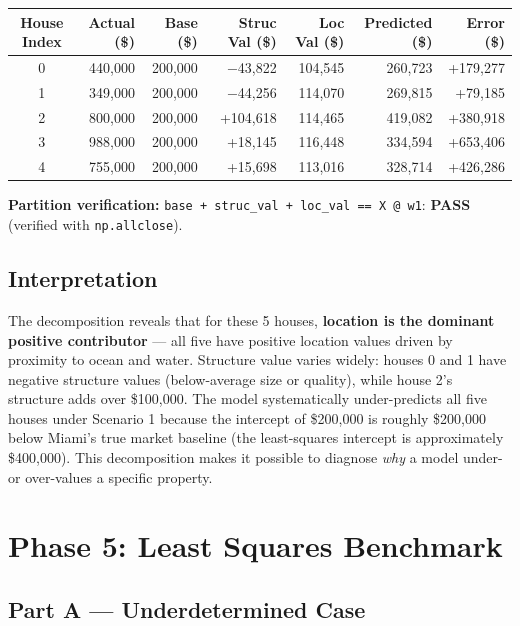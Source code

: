 \documentclass[11pt]{article}
\begin{document}
\begin{center}
\scriptsize
\begin{longtable}{c r r r r r r}
\toprule
House Index & Actual (\$) & Base (\$) & Struc Val (\$) & Loc Val (\$) & Predicted (\$) & Error (\$) \\
\midrule
0 & 440,000 & 200,000 & $-$43,822 & 104,545 & 260,723 & +179,277 \\
1 & 349,000 & 200,000 & $-$44,256 & 114,070 & 269,815 & +79,185 \\
2 & 800,000 & 200,000 & +104,618 & 114,465 & 419,082 & +380,918 \\
3 & 988,000 & 200,000 & +18,145  & 116,448 & 334,594 & +653,406 \\
4 & 755,000 & 200,000 & +15,698  & 113,016 & 328,714 & +426,286 \\
\bottomrule
\end{longtable}
\end{center}

\textbf{Partition verification:} \texttt{base + struc\_val + loc\_val == X @ w1}: \textbf{PASS} (verified with \texttt{np.allclose}).

\subsection*{Interpretation}

The decomposition reveals that for these 5 houses, \textbf{location is the dominant positive contributor} --- all five have positive location values driven by proximity to ocean and water. Structure value varies widely: houses 0 and 1 have negative structure values (below-average size or quality), while house 2's structure adds over \$100,000. The model systematically under-predicts all five houses under Scenario 1 because the intercept of \$200,000 is roughly \$200,000 below Miami's true market baseline (the least-squares intercept is approximately \$400,000). This decomposition makes it possible to diagnose \emph{why} a model under- or over-values a specific property.

\section{Phase 5: Least Squares Benchmark}

\subsection*{Part A --- Underdetermined Case}
\end{document}
